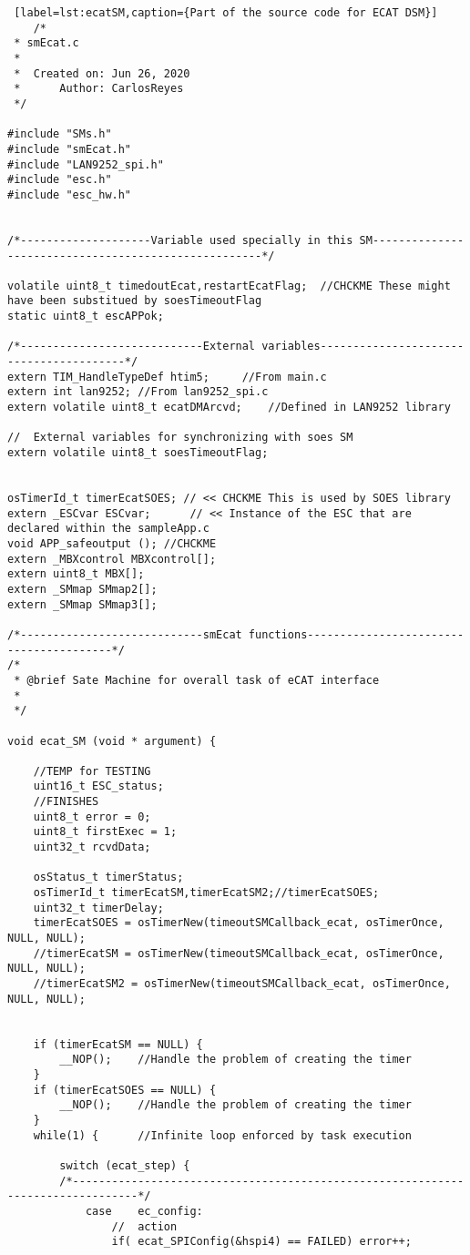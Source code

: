 \begin{lstlisting} [label=lst:ecatSM,caption={Part of the source code for ECAT DSM}]
    /*
 * smEcat.c
 *
 *  Created on: Jun 26, 2020
 *      Author: CarlosReyes
 */

#include "SMs.h"
#include "smEcat.h"
#include "LAN9252_spi.h"
#include "esc.h"
#include "esc_hw.h"


/*--------------------Variable used specially in this SM-----------------------------------------------------*/

volatile uint8_t timedoutEcat,restartEcatFlag;	//CHCKME These might have been substitued by soesTimeoutFlag
static uint8_t escAPPok;

/*----------------------------External variables----------------------------------------*/
extern TIM_HandleTypeDef htim5;		//From main.c
extern int lan9252; //From lan9252_spi.c
extern volatile uint8_t ecatDMArcvd;	//Defined in LAN9252 library

//	External variables for synchronizing with soes SM
extern volatile uint8_t soesTimeoutFlag;


osTimerId_t timerEcatSOES; // << CHCKME This is used by SOES library
extern _ESCvar ESCvar;		// << Instance of the ESC that are declared within the sampleApp.c
void APP_safeoutput ();	//CHCKME
extern _MBXcontrol MBXcontrol[];
extern uint8_t MBX[];
extern _SMmap SMmap2[];
extern _SMmap SMmap3[];

/*----------------------------smEcat functions----------------------------------------*/
/*
 * @brief Sate Machine for overall task of eCAT interface
 *
 */

void ecat_SM (void * argument) {

	//TEMP for TESTING
	uint16_t ESC_status;
	//FINISHES
	uint8_t error = 0;
	uint8_t firstExec = 1;
	uint32_t rcvdData;

	osStatus_t timerStatus;
	osTimerId_t timerEcatSM,timerEcatSM2;//timerEcatSOES;
	uint32_t timerDelay;
	timerEcatSOES = osTimerNew(timeoutSMCallback_ecat, osTimerOnce, NULL, NULL);
	//timerEcatSM = osTimerNew(timeoutSMCallback_ecat, osTimerOnce, NULL, NULL);
	//timerEcatSM2 = osTimerNew(timeoutSMCallback_ecat, osTimerOnce, NULL, NULL);


	if (timerEcatSM == NULL) {
		__NOP();	//Handle the problem of creating the timer
	}
	if (timerEcatSOES == NULL) {
		__NOP();	//Handle the problem of creating the timer
	}
	while(1) {		//Infinite loop enforced by task execution

		switch (ecat_step) {
		/*--------------------------------------------------------------------------------*/
			case	ec_config:
				//	action
				if(	ecat_SPIConfig(&hspi4) == FAILED) error++;


\end{lstlisting}
